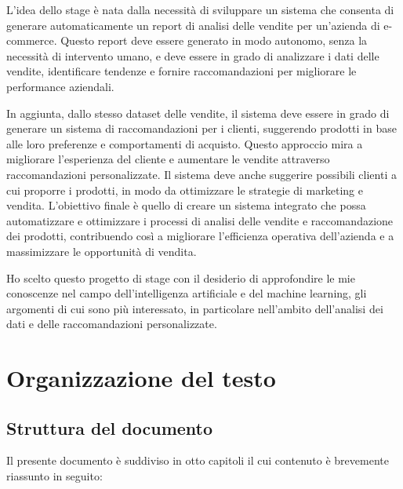 L'idea dello stage è nata dalla necessità di sviluppare un sistema che consenta di generare automaticamente un report di analisi delle vendite per un'azienda di e-commerce. Questo report deve essere generato in modo autonomo, senza la necessità di intervento umano, e deve essere in grado di analizzare i dati delle vendite, identificare tendenze e fornire raccomandazioni per migliorare le performance aziendali.

In aggiunta, dallo stesso dataset delle vendite, il sistema deve essere in grado di generare un sistema di raccomandazioni per i clienti, suggerendo prodotti in base alle loro preferenze e comportamenti di acquisto. Questo approccio mira a migliorare l'esperienza del cliente e aumentare le vendite attraverso raccomandazioni personalizzate. Il sistema deve anche suggerire possibili clienti a cui proporre i prodotti, in modo da ottimizzare le strategie di marketing e vendita.
L'obiettivo finale è quello di creare un sistema integrato che possa automatizzare e ottimizzare i processi di analisi delle vendite e raccomandazione dei prodotti, contribuendo così a migliorare l'efficienza operativa dell'azienda e a massimizzare le opportunità di vendita.

Ho scelto questo progetto di stage con il desiderio di approfondire le mie conoscenze nel campo dell'intelligenza artificiale e del machine learning, gli argomenti di cui sono più interessato, in particolare nell'ambito dell'analisi dei dati e delle raccomandazioni personalizzate.

\section{Organizzazione del testo}

\subsection{Struttura del documento}
\label{sec:organizzazione-testo}
Il presente documento è suddiviso in otto capitoli il cui contenuto è brevemente riassunto in seguito:

